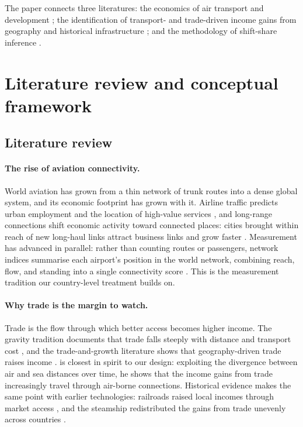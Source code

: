 The paper connects three literatures: the economics of air transport and
development \citep{Brueckner_2003,Campante_2017,Hovhannisyan_2015}; the
identification of transport- and trade-driven income gains from geography and
historical infrastructure \citep{Frankel_1999,Feyrer_2019,Donaldson_2018,%
Donaldson_2016,Pascali_2017}; and the methodology of shift-share inference
\citep{GoldsmithPinkham_2020,Adao_2019,Borusyak_2022}.

\section{Literature review and conceptual framework}
\label{sec:literature}
\subsection{Literature review}

\paragraph{The rise of aviation connectivity.} World aviation has grown from a
thin network of trunk routes into a dense global system, and its economic
footprint has grown with it. Airline traffic predicts urban employment and the
location of high-value services \citep{Brueckner_2003}, and long-range
connections shift economic activity toward connected places: cities brought
within reach of new long-haul links attract business links and grow faster
\citep{Campante_2017}. Measurement has advanced in parallel: rather than
counting routes or passengers, network indices summarise each airport's
position in the world network, combining reach, flow, and standing into a
single connectivity score \citep{Cheung_2020}. This is the measurement
tradition our country-level treatment builds on.

\paragraph{Why trade is the margin to watch.} Trade is the flow through which
better access becomes higher income. The gravity tradition documents that
trade falls steeply with distance and transport cost
\citep{Redding_2004,Hummels_2007}, and the trade-and-growth literature shows
that geography-driven trade raises income \citep{Frankel_1999,Alcala_2004}.
\citet{Feyrer_2019} is closest in spirit to our design: exploiting the
divergence between air and sea distances over time, he shows that the
income gains from trade increasingly travel through air-borne connections.
Historical evidence makes the same point with earlier technologies: railroads
raised local incomes through market access
\citep{Donaldson_2018,Donaldson_2016}, and the steamship redistributed the
gains from trade unevenly across countries \citep{Pascali_2017}.

